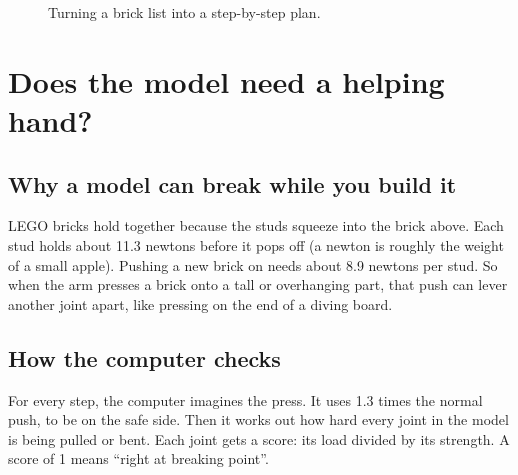 \documentclass[11pt,a4paper]{article}
\begin{document}
\begin{figure}[H]
\centering
{}
\caption{Turning a brick list into a step-by-step plan.}
\end{figure}

\section{Does the model need a helping hand?}

\subsection{Why a model can break while you build it}

LEGO bricks hold together because the studs squeeze into the brick above. Each
stud holds about 11.3 newtons before it pops off (a newton is roughly the weight
of a small apple). Pushing a new brick on needs about 8.9 newtons per stud. So
when the arm presses a brick onto a tall or overhanging part, that push can lever
another joint apart, like pressing on the end of a diving board.

\subsection{How the computer checks}

For every step, the computer imagines the press. It uses 1.3 times the normal
push, to be on the safe side. Then it works out how hard every joint in the
model is being pulled or bent. Each joint gets a score: its load divided by its
strength. A score of 1 means ``right at breaking point''.
\end{document}
